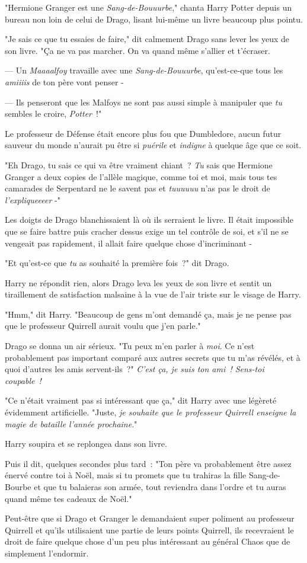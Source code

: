 "Hermione Granger est une \emph{Sang-de-Bouuurbe}," chanta Harry Potter depuis un bureau non loin de celui de Drago, lisant lui-même un livre beaucoup plus pointu.

"Je sais ce que tu essaies de faire," dit calmement Drago sans lever les yeux de son livre. "Ça ne va pas marcher. On va quand même s'allier et t'écraser.

--- Un \emph{Maaaalfoy} travaille avec une \emph{Sang-de-Bouuurbe}, qu'est-ce-que tous les \emph{amiiiis} de ton père vont penser -

--- Ils penseront que les Malfoys ne sont pas aussi simple à manipuler que \emph{tu} sembles le croire, \emph{Potter}~!"

Le professeur de Défense était encore plus fou que Dumbledore, aucun futur sauveur du monde n'aurait pu être si \emph{puérile} et \emph{indigne} à quelque âge que ce soit.

"Eh Drago, tu sais ce qui va être vraiment chiant~? \emph{Tu} sais que Hermione Granger a deux copies de l'allèle magique, comme toi et moi, mais tous tes camarades de Serpentard ne le savent pas et \emph{tuuuuuu} n'as pas le droit de \emph{l'expliqueeeer} -"

Les doigts de Drago blanchissaient là où ils serraient le livre. Il était impossible que se faire battre puis cracher dessus exige un tel contrôle de soi, et s'il ne se vengeait pas rapidement, il allait faire quelque chose d'incriminant -

"Et qu'est-ce que \emph{tu} as souhaité la première fois~?" dit Drago.

Harry ne répondit rien, alors Drago leva les yeux de son livre et sentit un tiraillement de satisfaction malsaine à la vue de l'air triste sur le visage de Harry.

"Hmm," dit Harry. "Beaucoup de gens m'ont demandé ça, mais je ne pense pas que le professeur Quirrell aurait voulu que j'en parle."

Drago se donna un air sérieux. "Tu peux m'en parler à \emph{moi}. Ce n'est probablement pas important comparé aux autres secrets que tu m'as révélés, et à quoi d'autres les amis servent-ils~?" \emph{C'est ça, je suis ton ami~! Sens-toi coupable~!}

"Ce n'était vraiment pas si intéressant que ça," dit Harry avec une légèreté évidemment artificielle. "Juste, \emph{je souhaite que le professeur Quirrell enseigne la magie de bataille l'année prochaine}."

Harry soupira et se replongea dans son livre.

Puis il dit, quelques secondes plus tard~: "Ton père va probablement être assez énervé contre toi à Noël, mais si tu promets que tu trahiras la fille Sang-de-Bourbe et que tu balaieras son armée, tout reviendra dans l'ordre et tu auras quand même tes cadeaux de Noël."

Peut-être que si Drago et Granger le demandaient super poliment au professeur Quirrell et qu'ils utilisaient une partie de leurs points Quirrell, ils recevraient le droit de faire quelque chose d'un peu plus intéressant au général Chaos que de simplement l'endormir.~ 

